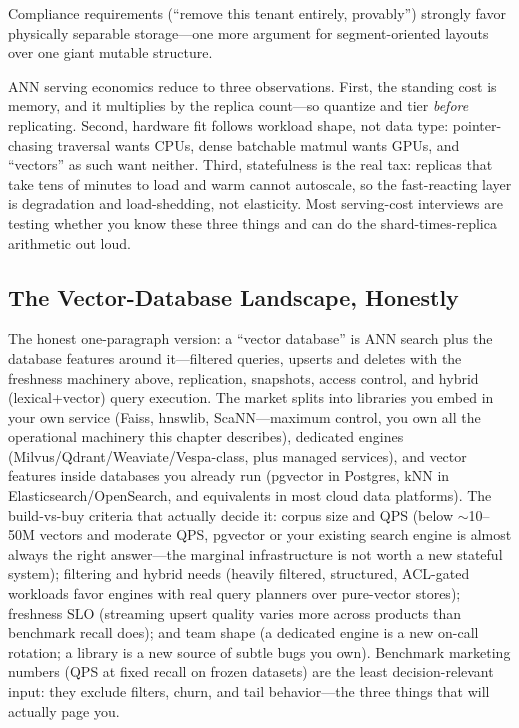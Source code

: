 Compliance requirements (``remove this tenant entirely, provably'') strongly favor physically separable storage---one more argument for segment-oriented layouts over one giant mutable structure.

\begin{keyinsight}
ANN serving economics reduce to three observations. First, the standing cost is memory, and it multiplies by the replica count---so quantize and tier \textit{before} replicating. Second, hardware fit follows workload shape, not data type: pointer-chasing traversal wants CPUs, dense batchable matmul wants GPUs, and ``vectors'' as such want neither. Third, statefulness is the real tax: replicas that take tens of minutes to load and warm cannot autoscale, so the fast-reacting layer is degradation and load-shedding, not elasticity. Most serving-cost interviews are testing whether you know these three things and can do the shard-times-replica arithmetic out loud.
\end{keyinsight}

\subsection{The Vector-Database Landscape, Honestly}

The honest one-paragraph version: a ``vector database'' is ANN search plus the database features around it---filtered queries, upserts and deletes with the freshness machinery above, replication, snapshots, access control, and hybrid (lexical+vector) query execution. The market splits into libraries you embed in your own service (Faiss, hnswlib, ScaNN---maximum control, you own all the operational machinery this chapter describes), dedicated engines (Milvus/Qdrant/Weaviate/Vespa-class, plus managed services), and vector features inside databases you already run (pgvector in Postgres, kNN in Elasticsearch/OpenSearch, and equivalents in most cloud data platforms). The build-vs-buy criteria that actually decide it: corpus size and QPS (below $\sim$10--50M vectors and moderate QPS, pgvector or your existing search engine is almost always the right answer---the marginal infrastructure is not worth a new stateful system); filtering and hybrid needs (heavily filtered, structured, ACL-gated workloads favor engines with real query planners over pure-vector stores); freshness SLO (streaming upsert quality varies more across products than benchmark recall does); and team shape (a dedicated engine is a new on-call rotation; a library is a new source of subtle bugs you own). Benchmark marketing numbers (QPS at fixed recall on frozen datasets) are the least decision-relevant input: they exclude filters, churn, and tail behavior---the three things that will actually page you.

